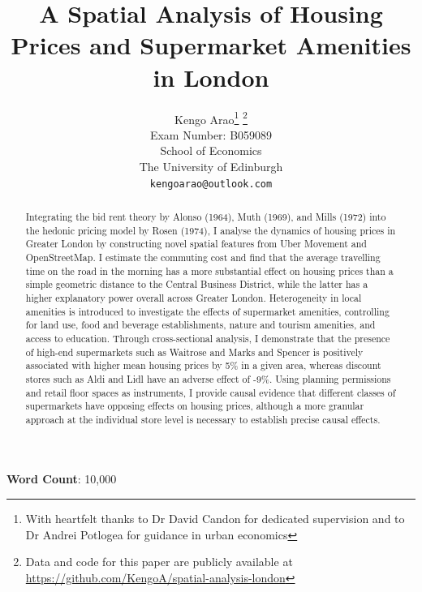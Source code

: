 \documentclass{article}
\title{A Spatial Analysis of Housing Prices and Supermarket Amenities in London}
\author{
  \large{Kengo Arao}\thanks{With heartfelt thanks to Dr David Candon for dedicated supervision and to Dr Andrei Potlogea for guidance in urban economics}      \thanks{Data and code for this paper are publicly available at \href{https://github.com/KengoA/spatial-analysis-london}{https://github.com/KengoA/spatial-analysis-london}} \\
  Exam Number: B059089 \\
  School of Economics\\
  The University of Edinburgh\\
  \texttt{kengoarao@outlook.com}
}
\begin{document}
\maketitle

\begin{abstract}
Integrating the bid rent theory by Alonso (1964), Muth (1969), and Mills (1972) into the hedonic pricing model by Rosen (1974), I analyse the dynamics of housing prices in Greater London by constructing novel spatial features from Uber Movement and OpenStreetMap. I estimate the commuting cost and find that the average travelling time on the road in the morning has a more substantial effect on housing prices than a simple geometric distance to the Central Business District, while the latter has a higher explanatory power overall across Greater London. Heterogeneity in local amenities is introduced to investigate the effects of supermarket amenities, controlling for land use, food and beverage establishments, nature and tourism amenities, and access to education. Through cross-sectional analysis, I demonstrate that the presence of high-end supermarkets such as Waitrose and Marks and Spencer is positively associated with higher mean housing prices by 5\% in a given area, whereas discount stores such as Aldi and Lidl have an adverse effect of -9\%. Using planning permissions and retail floor spaces as instruments, I provide causal evidence that different classes of supermarkets have opposing effects on housing prices, although a more granular approach at the individual store level is necessary to establish precise causal effects.

\end{abstract}

\begin{center}
    \textbf{Word Count}: 10,000
\end{center}

\newpage
\tableofcontents


\newpage
\end{document}
